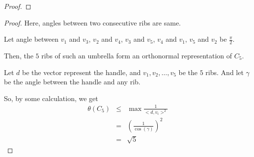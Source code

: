 \begin{frame}
\begin{proof}

      \end{proof}
\end{frame}

\begin{frame}
      \begin{proof}
            Here, angles between two consecutive ribs are same. 
            
            Let angle between $v_{1}$ and $v_{3}$, $v_{2}$ and $v_{4}$, $v_{3}$ and $v_{5}$, $v_{4}$ and $v_{1}$, $v_{5}$ and $v_{2}$ be $\frac{\pi}{2}$.

            Then, the $5$ ribs of such an umbrella form an orthonormal representation of $C_{5}$.

            Let $d$ be the vector represent the handle, and $v_{1},v_{2},\dots,v_{5}$ be the $5$ ribs. And let $\gamma$ be the angle between the handle and any rib.

            So, by some calculation, we get
            \begin{eqnarray}
                  \theta(C_{5}) &\le& \max \frac{1}{<d,v_{i}>^{2}} \\
                  &=& \left(
                        \frac{1}{\cos(\gamma)}
                  \right)^{2} \\
                  &=& \sqrt{5}
            \end{eqnarray}
      \end{proof}
\end{frame}